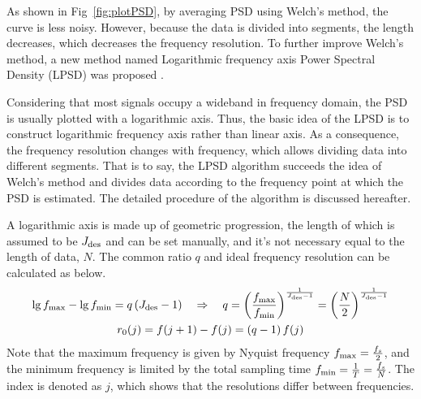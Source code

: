 As shown in Fig~\ref{fig:plotPSD}, by averaging PSD using Welch's method, the curve is less noisy. However, because the data is divided into segments, the length decreases, which decreases the frequency resolution. To further improve Welch's method, a new method named Logarithmic frequency axis Power Spectral Density (LPSD) was proposed \cite{trobsImprovedSpectrumEstimation2006}.


Considering that most signals occupy a wideband in frequency domain, the PSD is usually plotted with a logarithmic axis. Thus, the basic idea of the LPSD is to construct logarithmic frequency axis rather than linear axis. As a consequence, the frequency resolution changes with frequency, which allows dividing data into different segments. That is to say, the LPSD algorithm succeeds the idea of Welch's method and divides data according to the frequency point at which the PSD is estimated. The detailed procedure of the algorithm is discussed hereafter.


A logarithmic axis is made up of geometric progression, the length of which is assumed to be $J_{\rm des}$ and can be set manually, and it's not necessary equal to the length of data, $N$. The common ratio $q$ and ideal frequency resolution can be calculated as below.
\begin{gather}
    \lg f_{\rm max} - \lg f_{\rm min} = q\left(J_{\rm des} -1 \right) \quad \Rightarrow \quad q = \left(\frac{f_{\rm max}}{f_{\rm min}}\right)^{\frac{1}{J_{\rm des} -1}} = \left(\frac{N}{2}\right)^{\frac{1}{J_{\rm des} -1}} \\
    r_0(j) = f(j+1) - f(j) = \left(q-1\right) f(j)
    \label{eq:r0}
\end{gather}
Note that the maximum frequency is given by Nyquist frequency $f_{\rm max} = \frac{f_s}{2}$, and the minimum frequency is limited by the total sampling time $f_{\rm min} = \frac{1}{T} = \frac{f_s}{N}$. The index is denoted as $j$, which shows that the resolutions differ between frequencies.


